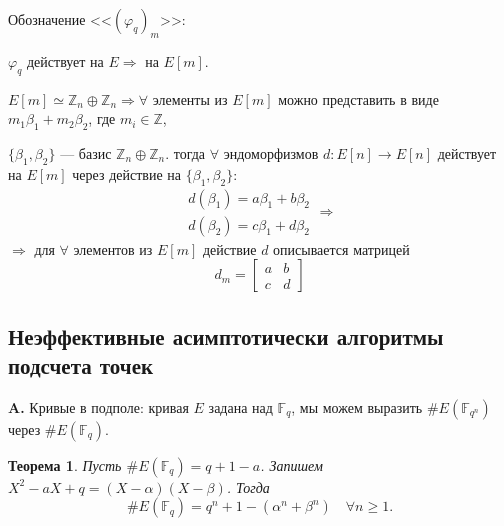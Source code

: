 \documentclass[12pt]{article}
\newcommand{\Z}{{{\mathbb Z}}}
\newcommand{\F}{{{\mathbb F}}}
\newtheorem{theorem}{Теорема}
\theoremstyle{definition}
\theoremstyle{definition}
\theoremstyle{definition}
\begin{document}
Обозначение <<${( {{\varphi _q}} )_m}$>>: 

${\varphi _q}$ действует на $E \Rightarrow $ на $E[ m ]$.

$E[ m ] \simeq {\Z_n} \oplus {\Z_n} \Rightarrow \forall $ элементы из $E[ m ]$ можно представить в виде ${m_1}{\beta _1} + {m_2}{\beta _2}$, где ${m_i} \in \Z$, 

$\{ {{\beta _1},{\beta _2}} \}$ — базис ${\Z_n} \oplus {\Z_n}$. тогда $\forall $ эндоморфизмов $d: E[ n ] \to E[ n ]$ действует на $E[ m ]$ через действие на $\{ {{\beta _1},{\beta _2}} \}$:  
$$
    \begin{array}{*{20}{c}}
    {d( \beta _1 ) = a{\beta _1} + b{\beta _2}} \\ 
    {d( \beta _2 ) = c{\beta _1} + d{\beta _2}} 
    \end{array} \Rightarrow 
$$
$ \Rightarrow $ для $\forall $ элементов из $E[ m ]$ действие $d$ описывается матрицей
$${d_m} = \left[ {\begin{array}{*{20}{c}}
	a&b \\ 
	c&d 
	\end{array}} \right]
$$

\subsection{Неэффективные асимптотически алгоритмы подсчета точек}

\textbf{A.} Кривые в подполе: кривая $E$ задана над ${\F_q}$, мы можем выразить $\# E( \F_{q^n} )$ через $\# E( \F_q )$. 

\begin{theorem}
	Пусть $\# E( {{\F_q}} ) = q + 1 - a$. Запишем ${X^2} - aX + q = ( {X - \alpha} )( {X - \beta } )$. Тогда 
	$$
	\# E(\F_q ) = {q^n} + 1 - ( \alpha^n+ \beta ^n )\quad \forall n \geqslant 1.
	$$
\end{theorem}
\end{document}
